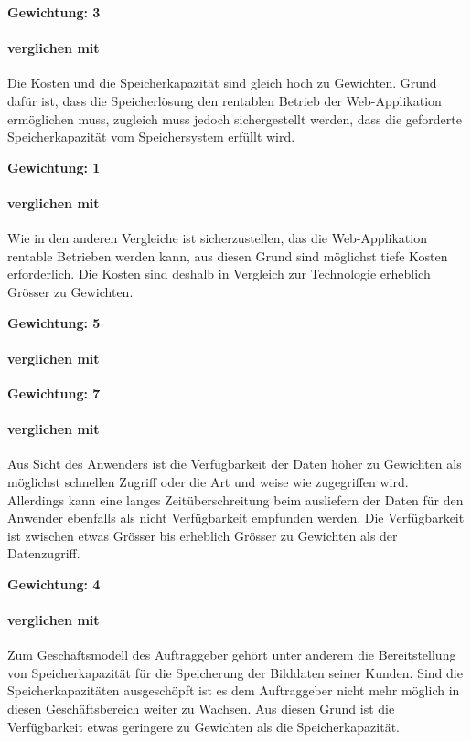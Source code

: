 \textbf{Gewichtung: 3}

\paragraph*{ verglichen mit }
Die Kosten und die Speicherkapazität sind gleich hoch zu Gewichten. Grund dafür ist, dass die Speicherlösung den rentablen Betrieb der Web-Applikation ermöglichen muss, zugleich muss jedoch sichergestellt werden, dass die geforderte Speicherkapazität vom Speichersystem erfüllt wird.

\textbf{Gewichtung: 1}

\paragraph*{ verglichen mit }
Wie in den anderen Vergleiche ist sicherzustellen, das die Web-Applikation rentable Betrieben werden kann, aus diesen Grund sind möglichst tiefe Kosten erforderlich. Die Kosten sind deshalb in Vergleich zur Technologie erheblich Grösser zu Gewichten.

\textbf{Gewichtung: 5}

\paragraph*{ verglichen mit }

\textbf{Gewichtung: 7}
\paragraph*{ verglichen mit }
Aus Sicht des Anwenders ist die Verfügbarkeit der Daten höher zu Gewichten als möglichst schnellen Zugriff oder die Art und weise wie zugegriffen wird. Allerdings kann eine langes Zeitüberschreitung beim ausliefern der Daten für den Anwender ebenfalls als nicht Verfügbarkeit empfunden werden. Die Verfügbarkeit ist zwischen etwas Grösser bis erheblich Grösser zu Gewichten als der Datenzugriff.

\textbf{Gewichtung: 4}

\paragraph*{ verglichen mit }
Zum Geschäftsmodell des Auftraggeber gehört unter anderem die Bereitstellung von Speicherkapazität für die Speicherung der Bilddaten seiner Kunden. Sind die Speicherkapazitäten ausgeschöpft ist es dem Auftraggeber nicht mehr möglich in diesen Geschäftsbereich weiter zu Wachsen. Aus diesen Grund ist die Verfügbarkeit etwas geringere zu Gewichten als die Speicherkapazität.


